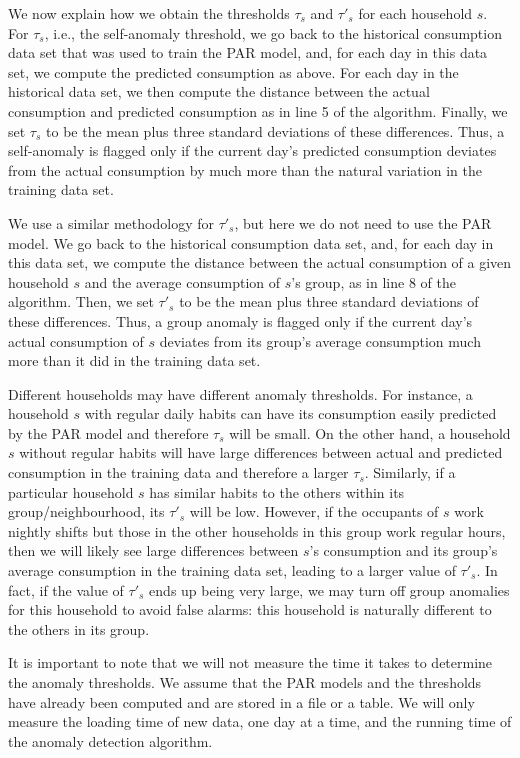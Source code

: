 \documentclass[prodmode,acmtods]{acmsmall}
\begin{document}
We now explain how we obtain the thresholds $\tau_s$ and $\tau'_s$ for each household $s$.  For $\tau_s$, i.e., the self-anomaly threshold, we go back to the historical consumption data set that was used to train the PAR model, and, for each day in this data set, we compute the predicted consumption as above.  For each day in the historical data set, we then compute the distance between the actual consumption and predicted consumption as in line 5 of the algorithm.  Finally, we set $\tau_s$ to be the mean plus three standard deviations of these differences.  Thus, a self-anomaly is flagged only if the current day's predicted consumption deviates from the actual consumption by much more than the natural variation in the training data set.

We use a similar methodology for $\tau'_s$, but here we do not need to use the PAR model.  We go back to the historical consumption data set, and, for each day in this data set, we compute the distance between the actual consumption of a given household $s$ and the average consumption of $s$'s group, as in line 8 of the algorithm.  Then, we set $\tau'_s$ to be the mean plus three standard deviations of these differences.  Thus, a group anomaly is flagged only if the current day's actual consumption of $s$ deviates from its group's average consumption much more than it did in the training data set.

Different households may have different anomaly thresholds.  For instance, a household $s$ with regular daily habits can have its consumption easily predicted by the PAR model and therefore $\tau_s$ will be small.  On the other hand, a household $s$ without regular habits will have large differences between actual and predicted consumption in the training data and therefore a larger $\tau_s$.  Similarly, if a particular household $s$ has similar habits to the others within its group/neighbourhood, its $\tau'_s$ will be low.  However, if the occupants of $s$ work nightly shifts but those in the other households in this group work regular hours, then we will likely see large differences between $s$'s consumption and its group's average consumption in the training data set, leading to a larger value of $\tau'_s$.  In fact, if the value of $\tau'_s$ ends up being very large, we may turn off group anomalies for this household to avoid false alarms: this household is naturally different to the others in its group.

It is important to note that we will not measure the time it takes to determine the anomaly thresholds.  We assume that the PAR models and the thresholds have already been computed and are stored in a file or a table.  We will only measure the loading time of new data, one day at a time, and the running time of the anomaly detection algorithm.
\end{document}
